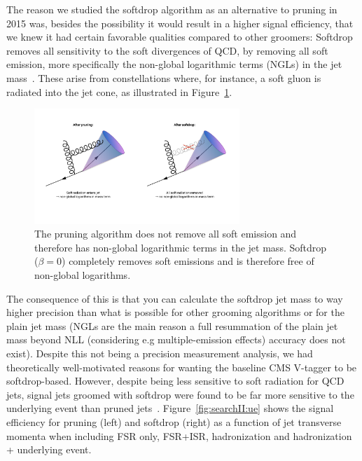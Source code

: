 The reason we studied the softdrop algorithm as an alternative to pruning in 2015 was, besides the possibility it would result in a higher signal efficiency, that we knew it had certain favorable qualities compared to other groomers: Softdrop removes all sensitivity to the soft divergences of QCD, by removing all soft emission, more specifically the non-global logarithmic terms (NGLs) in the jet mass~\cite{Dasgupta:2013ihk}. These arise from constellations where, for instance, a soft gluon is radiated into the jet cone, as illustrated in Figure~\ref{fig:searchII:ngls}. 
\begin{figure}[h!]
\centering
\includegraphics[width=0.69\textwidth]{figures/analysis/search2/misc/ngls.pdf}
\caption{The pruning algorithm does not remove all soft emission and therefore has non-global logarithmic terms in the jet mass. Softdrop ($\beta = 0$) completely removes soft emissions and is therefore free of non-global logarithms.}
\label{fig:searchII:ngls}
\end{figure}
The consequence of this is that you can calculate the softdrop jet mass to way higher precision than what is possible for other grooming algorithms or for the plain jet mass (NGLs are the main reason a full resummation of the plain jet mass beyond NLL (considering e.g multiple-emission effects) accuracy does not exist). Despite this not being a precision measurement analysis, we had theoretically well-motivated reasons for wanting the baseline CMS V-tagger to be softdrop-based. However, despite being less sensitive to soft radiation for QCD jets, signal jets groomed with softdrop were found to be far more sensitive to the underlying event than pruned jets~\cite{Dasgupta:2015yua}. Figure~\ref{fig:searchII:ue} shows the signal efficiency for pruning (left) and softdrop (right) as a function of jet transverse momenta when including FSR only, FSR+ISR, hadronization and hadronization + underlying event.
